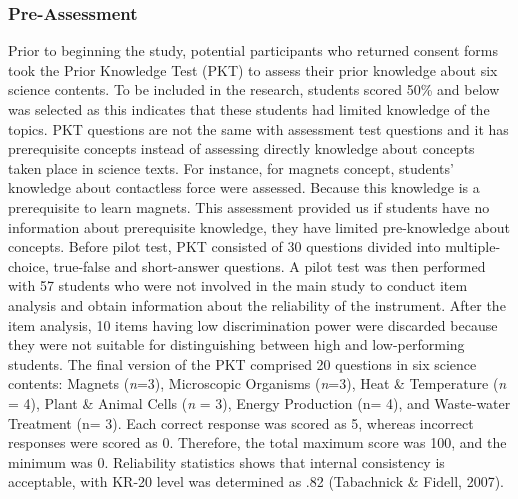 \documentclass[11.5pt]{sig-alternate} %
\begin{document}
\begin{large}
\subsubsection*{Pre-Assessment}
Prior to beginning the study, potential participants who returned consent forms took the Prior Knowledge Test (PKT) to assess their prior knowledge about six science contents. To be included in the research, students scored 50\% and below was selected as this indicates that these students had limited knowledge of the topics. PKT questions are not the same with assessment test questions and it has prerequisite concepts instead of assessing directly knowledge about concepts taken place in science texts. For instance, for magnets concept, students’ knowledge about contactless force were assessed. Because this knowledge is a prerequisite to learn magnets. This assessment provided us if students have no information about prerequisite knowledge, they have limited pre-knowledge about concepts. Before pilot test, PKT consisted of 30 questions divided into multiple-choice, true-false and short-answer questions. A pilot test was then performed with 57 students who were not involved in the main study to conduct item analysis and obtain information about the reliability of the instrument. After the item analysis, 10 items having low discrimination power were discarded because they were not suitable for distinguishing between high and low-performing students. The final version of the PKT comprised 20 questions in six science contents: Magnets (\textit{n}=3), Microscopic Organisms (\textit{n}=3), Heat \& Temperature (\textit{n} = 4), Plant \& Animal Cells (\textit{n} = 3), Energy Production (n= 4), and Waste-water Treatment (n= 3). Each correct response was scored as 5, whereas incorrect responses were scored as 0. Therefore, the total maximum score was 100, and the minimum was 0. Reliability statistics shows that internal consistency is acceptable, with KR-20 level was determined as .82 (Tabachnick \& Fidell, 2007). 


\end{large}
\end{document}
